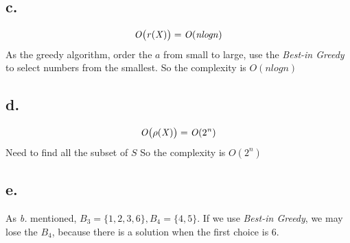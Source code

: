 \documentclass{article}
\begin{document}
{    \subsection*{c.}{
        \[\mathit{O\big{(}r(X)\big{)}=O(n log n)}\]
        As the greedy algorithm, order the \(\mathit{a}\) from small to large, use the \textit{Best-in Greedy} to select numbers from the smallest. So the complexity is \(\mathit{O(n log n)}\)
    }
    \subsection*{d.}{
        \[\mathit{O\big{(}\rho(X)\big{)}=O(\mathrm{2}^n)}\]
        Need to find all the subset of \(\mathit{S}\) So the complexity is \(\mathit{O(\mathrm{2}^n)}\)
    }
    \subsection*{e.}{
        As \textit{b.} mentioned, \(\mathit{B}_{\mathrm{3}}=\mathrm{\{1,2,3,6\}},\mathit{B}_{\mathrm{4}}=\mathrm{\{4,5\}}\). If we use \textit{Best-in Greedy}, we may lose the \(\mathit{B}_{\mathrm{4}}\), because there is a solution when the first choice is 6. 
    }
}
\end{document}

